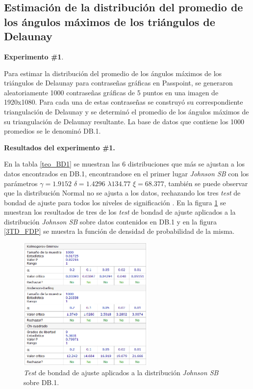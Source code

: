 \documentclass[12pt]{report}
\begin{document}
\subsection{Estimación de la distribución del promedio de los ángulos máximos de los triángulos de Delaunay }
	\textbf{Experimento \#1}.
	
	 Para estimar la distribución del promedio de los ángulos máximos de los triángulos de Delaunay para contraseñas gráficas en Passpoint, se generaron aleatoriamente 1000 contraseñas gráficas de 5 puntos en una imagen de 1920x1080. Para cada una de estas contraseñas se  construyó  su correspondiente triangulación  de Delaunay  y se  determinó el promedio  de los ángulos máximos de su triangulación de Delaunay resultante. La base de datos que contiene los 1000 promedios se le denominó DB.1.
	 
	 \textbf{Resultados del experimento \#1.}
	 
	 En la tabla \ref{teo_BD1}  se muestran las 6 distribuciones que más se ajustan a los datos encontrados en DB.1, encontrandose en el primer lugar \textit{Johnson SB} con los parámetros $\gamma=1.9152$ $\delta=1.4296$ $\lambda134.77$  $\xi=68.377$, también se puede observar que la distribución Normal no se ajusta  a los datos, rechazando los tres \textit{test} de bondad de ajuste para todos los niveles de significación . En la figura \ref{3TD_BONDAD} se  muestran los resultados de tres de los \textit{test} de bondad de ajuste aplicados a la distribución \textit{Johnson SB} sobre  datos contenidos en DB.1  y en la figura \ref{3TD_FDP}  se muestra la función de densidad de probabilidad de la misma.
	  	\begin{figure}[ht]
	  	\centering
	  	
 	  	\includegraphics[width=0.6\textwidth]{3td_BONDAD.png}
	  	\caption{\textit{Test} de bondad de ajuste aplicados a la distribución \textit{Johnson SB} sobre DB.1.}
	  	\label{3TD_BONDAD}
	  \end{figure}
	  
\end{document}
